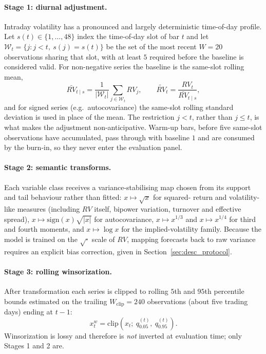 \paragraph{Stage 1: diurnal adjustment.}
Intraday volatility has a pronounced and largely deterministic time-of-day
profile. Let $s(t) \in \{1,\dots,48\}$ index the time-of-day slot of bar $t$ and
let $\mathcal{W}_t = \{j : j < t,\ s(j)=s(t)\}$ be the set of the most recent
$W = 20$ observations sharing that slot, with at least $5$ required before the
baseline is considered valid. For non-negative series the baseline is the
same-slot rolling mean,
\begin{equation}
    \bar{RV}_{t\mid s} = \frac{1}{|\mathcal{W}_t|}\sum_{j \in \mathcal{W}_t} RV_j,
    \qquad
    \widetilde{RV}_t = \frac{RV_t}{\bar{RV}_{t\mid s}} ,
    \label{eq:desc_diurnal}
\end{equation}
and for signed series (e.g.\ autocovariance) the same-slot rolling standard
deviation is used in place of the mean. The restriction $j < t$, rather than
$j \le t$, is what makes the adjustment non-anticipative. Warm-up bars, before
five same-slot observations have accumulated, pass through with baseline $1$ and
are consumed by the burn-in, so they never enter the evaluation panel.

\paragraph{Stage 2: semantic transforms.}
Each variable class receives a variance-stabilising map chosen from its
support and tail behaviour rather than fitted: $x \mapsto \sqrt{x}$ for squared-
return and volatility-like measures (including $RV$ itself, bipower variation,
turnover and effective spread), $x \mapsto \mathrm{sign}(x)\sqrt{|x|}$ for
autocovariance, $x \mapsto x^{1/3}$ and $x \mapsto x^{1/4}$ for third and fourth
moments, and $x \mapsto \log x$ for the implied-volatility family. Because the
model is trained on the $\sqrt{\cdot}$ scale of $RV$, mapping forecasts back to
raw variance requires an explicit bias correction, given in
Section~\ref{sec:desc_protocol}.

\paragraph{Stage 3: rolling winsorization.}
After transformation each series is clipped to rolling $5$th and $95$th
percentile bounds estimated on the trailing $W_{\mathrm{clip}} = 240$
observations (about five trading days) ending at $t-1$:
\begin{equation}
    x_t^{w} = \mathrm{clip}\!\left(x_t;\ q^{(t)}_{0.05},\ q^{(t)}_{0.95}\right).
    \label{eq:desc_winsor}
\end{equation}
Winsorization is lossy and therefore is \emph{not} inverted at evaluation time;
only Stages 1 and 2 are.

